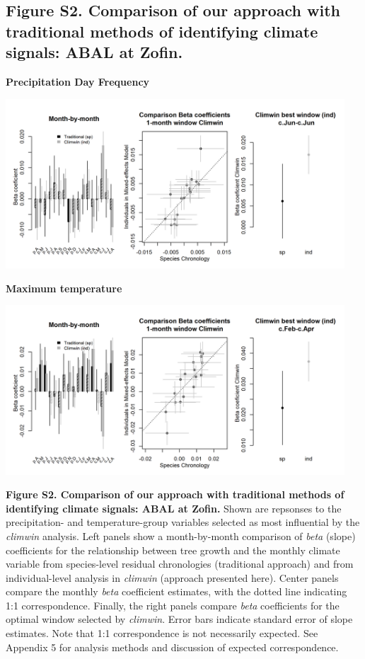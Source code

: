 \documentclass[
]{article}
\begin{document}
\newpage

\hypertarget{figure-s2.-comparison-of-our-approach-with-traditional-methods-of-identifying-climate-signals-abal-at-zofin.}{%
\subsection{Figure S2. Comparison of our approach with traditional
methods of identifying climate signals: ABAL at
Zofin.}\label{figure-s2.-comparison-of-our-approach-with-traditional-methods-of-identifying-climate-signals-abal-at-zofin.}}

\textbf{Precipitation Day Frequency}

\includegraphics[width=0.95\textwidth,height=\textheight]{tables_figures/SI_figures/traditional_comparison/climwin_vs_dcc_Zofin_ABAL_wet.png}

\textbf{Maximum temperature}

\includegraphics[width=0.95\textwidth,height=\textheight]{tables_figures/SI_figures/traditional_comparison/climwin_vs_dcc_Zofin_ABAL_tmx.png}

\textbf{Figure S2. Comparison of our approach with traditional methods
of identifying climate signals: ABAL at Zofin.} Shown are repsonses to
the precipitation- and temperature-group variables selected as most
influential by the \emph{climwin} analysis. Left panels show a
month-by-month comparison of \emph{beta} (slope) coefficients for the
relationship between tree growth and the monthly climate variable from
species-level residual chronologies (traditional approach) and from
individual-level analysis in \emph{climwin} (approach presented here).
Center panels compare the monthly \emph{beta} coefficient estimates,
with the dotted line indicating 1:1 correspondence. Finally, the right
panels compare \emph{beta} coefficients for the optimal window selected
by \emph{climwin}. Error bars indicate standard error of slope
estimates. Note that 1:1 correspondence is not necessarily expected. See
Appendix 5 for analysis methods and discussion of expected
correspondence.
\end{document}

